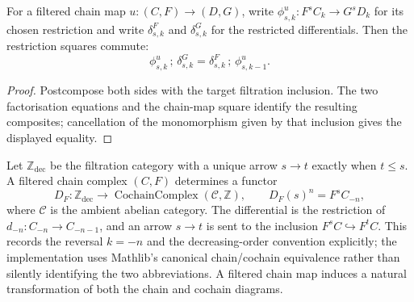 \begin{theorem}
  \label{thm:filtered-chain-map-restricted-differential}
  \leanok
  For a filtered chain map $u:(C,F)\to(D,G)$, write
  $\phi^u_{s,k}:F^sC_k\to G^sD_k$ for its chosen restriction and write
  $\delta^F_{s,k}$ and $\delta^G_{s,k}$ for the restricted differentials.
  Then the restriction squares commute:
  \[
    \phi^u_{s,k}\,;\,\delta^G_{s,k}
      =\delta^F_{s,k}\,;\,\phi^u_{s,k-1}.
  \]
\end{theorem}

\begin{proof}
  \leanok
  Postcompose both sides with the target filtration inclusion.  The two
  factorisation equations and the chain-map square identify the resulting
  composites; cancellation of the monomorphism given by that inclusion gives
  the displayed equality.
\end{proof}

\begin{definition}
  \label{def:filtered-complex-cochain-diagram}
  \leanok
  Let $\mathbb Z_{\mathrm{dec}}$ be the filtration category with a unique arrow
  $s\to t$ exactly when $t\le s$.  A filtered chain complex $(C,F)$ determines
  a functor
  \[
    D_F:\mathbb Z_{\mathrm{dec}}\longrightarrow
      \operatorname{CochainComplex}(\mathcal C,\mathbb Z),
    \qquad D_F(s)^n=F^sC_{-n},
  \]
  where $\mathcal C$ is the ambient abelian category.
  The differential is the restriction of $d_{-n}:C_{-n}\to C_{-n-1}$, and an
  arrow $s\to t$ is sent to the inclusion $F^sC\hookrightarrow F^tC$.  This
  records the reversal $k=-n$ and the decreasing-order convention explicitly;
  the implementation uses Mathlib's canonical chain/cochain equivalence rather
  than silently identifying the two abbreviations.  A filtered chain map
  induces a natural transformation of both the chain and cochain diagrams.
\end{definition}


